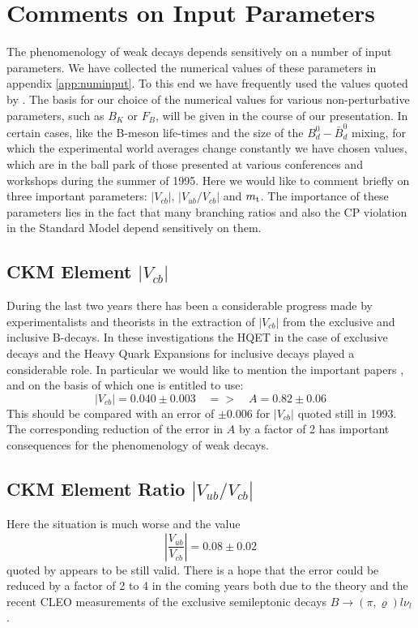 \section{Comments on Input Parameters}
         \label{sec:inputparams}
The phenomenology of weak decays depends sensitively on a number of
input parameters. We have collected the numerical values of these
parameters in appendix \ref{app:numinput}. To this end we have
frequently used the values quoted by \cite{particledata:94}. The basis
for our choice of the numerical values for various non-perturbative
parameters, such as $B_K$ or $F_B$, will be given in the course of our
presentation. In certain cases, like the B-meson life-times and the
size of the $B^0_d-\bar B^0_d$ mixing, for which the experimental world
averages change constantly we have chosen values, which are in the ball
park of those presented at various conferences and workshops during the
summer of 1995. Here we would like to comment briefly on three
important parameters:  $\left| V_{cb} \right|$, $\left| V_{ub}/V_{cb}
\right|$ and $m_{\rm t}$.  The importance of these parameters lies in the
fact that many branching ratios and also the CP violation in the
Standard Model depend sensitively on them.

\subsection{CKM Element $\left| V_{cb} \right|$}
         \label{subsec:inputparams:Vcb}
During the last two years there has been a considerable progress made
by experimentalists \cite{patterson:95} and theorists in the extraction of
$\left| V_{cb} \right|$ from the exclusive and inclusive B-decays.  In
these investigations the HQET in the case of exclusive decays and the
Heavy Quark Expansions for inclusive decays played a considerable
role.  In particular we would like to mention the important papers
\cite{neubert:94b}, \cite{shifmanetal:95} and \cite{braunetal:95} on
the basis of which one is entitled to use:
\begin{equation}
\label{eq:Vcberr}
\left| V_{cb} \right|=0.040\pm0.003\quad =>\quad A=0.82\pm 0.06
\end{equation}
This should be compared with an error of $\pm 0.006$  for 
$\left| V_{cb} \right|$ quoted still in 1993. The corresponding
reduction of the error in $A$ by a factor of 2 has important
consequences for the phenomenology of weak decays.

\subsection{CKM Element Ratio $\left| V_{ub}/V_{cb} \right|$}
         \label{subsec:inputparams:Vubcb}
Here the situation is much worse and the value
\begin{equation}
\label{eq:Vubcberr}
\left| \frac{V_{ub}}{V_{cb}} \right|=0.08\pm0.02
\end{equation}
quoted by \cite{particledata:94} appears to be still valid. There is a
hope that the error could be reduced by a factor of 2 to 4 in the
coming years both due to the theory \cite{braunetal:95} and the recent
CLEO measurements of the exclusive semileptonic decays $B \to
(\pi,\varrho)l\nu_l$ \cite{thorndike:95}.

